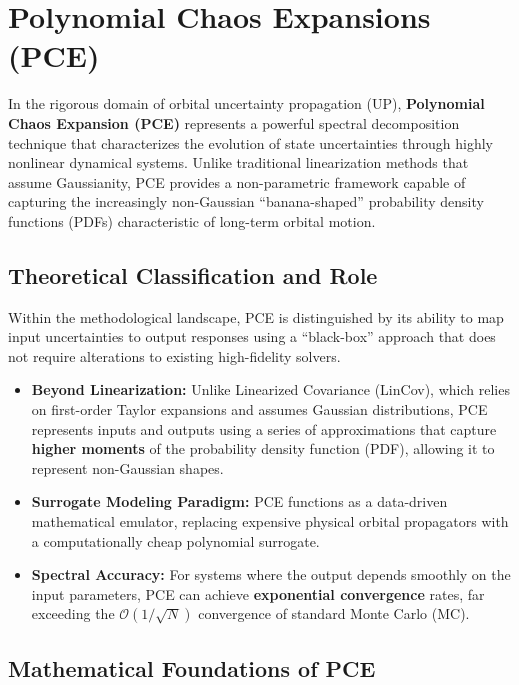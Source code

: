 \documentclass[
  letterpaper,
  DIV=11,
  numbers=noendperiod,
  oneside]{scrartcl}
\begin{document}
\section{Polynomial Chaos Expansions
(PCE)}\label{polynomial-chaos-expansions-pce}

In the rigorous domain of orbital uncertainty propagation (UP),
\textbf{Polynomial Chaos Expansion (PCE)} represents a powerful spectral
decomposition technique that characterizes the evolution of state
uncertainties through highly nonlinear dynamical systems. Unlike
traditional linearization methods that assume Gaussianity, PCE provides
a non-parametric framework capable of capturing the increasingly
non-Gaussian ``banana-shaped'' probability density functions (PDFs)
characteristic of long-term orbital motion.

\subsection{Theoretical Classification and
Role}\label{theoretical-classification-and-role}

Within the methodological landscape, PCE is distinguished by its ability
to map input uncertainties to output responses using a ``black-box''
approach that does not require alterations to existing high-fidelity
solvers.

\begin{itemize}
\item
  \textbf{Beyond Linearization:} Unlike Linearized Covariance (LinCov),
  which relies on first-order Taylor expansions and assumes Gaussian
  distributions, PCE represents inputs and outputs using a series of
  approximations that capture \textbf{higher moments} of the probability
  density function (PDF), allowing it to represent non-Gaussian shapes.
\item
  \textbf{Surrogate Modeling Paradigm:} PCE functions as a data-driven
  mathematical emulator, replacing expensive physical orbital
  propagators with a computationally cheap polynomial surrogate.
\item
  \textbf{Spectral Accuracy:} For systems where the output depends
  smoothly on the input parameters, PCE can achieve \textbf{exponential
  convergence} rates, far exceeding the \(\mathcal{O}(1/\sqrt{N})\)
  convergence of standard Monte Carlo (MC).
\end{itemize}

\subsection{Mathematical Foundations of
PCE}\label{mathematical-foundations-of-pce}
\end{document}

